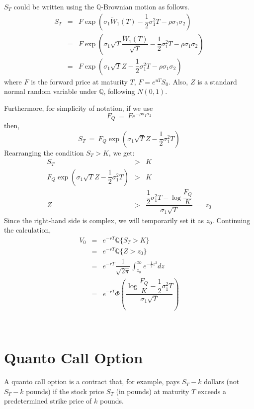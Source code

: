 \documentclass[uplatex,a4j,12pt,dvipdfmx]{jsarticle}
\begin{document}
$S_{T}$ could be written using the $\mathbb{Q}$-Brownian motion as follows.
%
%
\begin{eqnarray}
	S_{T}
	&=&
	F
	\exp \left( \sigma_{1} \tilde{W}_{1}(T) -
	\dfrac{1}{2} \sigma_{1}^{2} T -
	\rho \sigma_{1} \sigma_{2}
	\right)
	\\ &=&
	F
	\exp \left( \sigma_{1} \sqrt{T} \dfrac{ \tilde{W}_{1}(T) }{ \sqrt{T} } -
	\dfrac{1}{2} \sigma_{1}^{2} T -
	\rho \sigma_{1} \sigma_{2} \right)
	\\ &=&
	F
	\exp \left( \sigma_{1} \sqrt{T} Z -
	\dfrac{1}{2} \sigma_{1}^{2} T  -
	\rho \sigma_{1} \sigma_{2}\right)
\end{eqnarray}
%
%
where $F$ is the forward price at maturity $T$, $F = e^{uT} S_{0}$.
Also, $Z$ is a standard normal random variable under $\mathbb{Q}$, following $N(0,1)$.

Furthermore, for simplicity of notation, if we use
$$
	F_{Q} \ = \ F e^{- \rho \sigma_{1} \sigma_{2} }
$$
then,
$$
	S_{T}
	\ = \
	F_{Q}
	\exp \left( \sigma_{1} \sqrt{T} Z -
	\dfrac{1}{2} \sigma_{1}^{2} T
	\right)
$$
Rearranging the condition $S_{T}>K$, we get:
%
%
\begin{eqnarray}
	S_{T}
	&>&
	K
	\\
	F_{Q}
	\exp \left( \sigma_{1} \sqrt{T} Z -
	\dfrac{1}{2} \sigma_{1}^{2} T
	\right)
	&>&
	K
	\\
	Z
	&>&
	\dfrac{
		\dfrac{1}{2} \sigma_{1}^{2} T
		-
		\log
		\dfrac{F_{Q}}{K}
	}{\sigma_{1} \sqrt{T}}
	\ = \
	z_{0}
\end{eqnarray}
%
%
Since the right-hand side is complex, we will temporarily set it as $z_{0}$.
Continuing the calculation,
%
%
\begin{eqnarray}
	V_{0}
	&=&
	e^{-rT}
	\mathbb{Q}
	\{ S_{T} > K \}
	\\ &=&
	e^{-rT}
	\mathbb{Q}
	\{ Z > z_{0} \}
	\\ &=&
	e^{-rT}
	\dfrac{1}{ \sqrt{2 \pi} }
	\int^{\infty}_{z_{0}}
	e^{
			- \frac{1}{2} z^{2}
		} dz
	\\ &=&
	e^{-rT}
	\Phi
	\left(
	\dfrac{
		\log
		\dfrac{F_{Q}}{K}
		-
		\dfrac{1}{2} \sigma_{1}^{2} T
	}{\sigma_{1} \sqrt{T}}
	\right)
\end{eqnarray}
%
%


\ \\[-10mm]

\section{Quanto Call Option}
A quanto call option is a contract that, for example, pays
$S_{T} - k$ dollars (not $S_{T} - k$ pounds) if the stock price $S_{T}$ (in pounds) at maturity $T$ exceeds a predetermined strike price of $k$ pounds.
\end{document}
